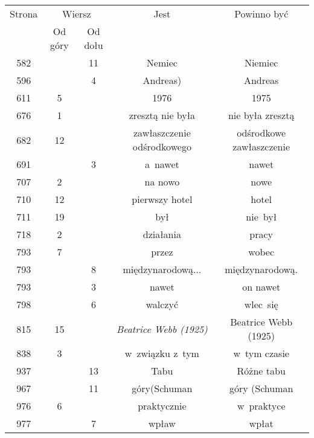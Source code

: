 \documentclass[a4paper,11pt]{article}
\numberwithin{equation}{section}
\begin{document}
\begin{center}
  \newpage

  \begin{tabular}{|c|c|c|c|c|}
    \hline
    Strona & \multicolumn{2}{c|}{Wiersz} & Jest
                              & Powinno być \\ \cline{2-3}
    & Od góry & Od dołu & & \\
    \hline
    582 & & 11 & Nemiec & Niemiec \\
    596 & &  4 & Andreas) & Andreas \\
    611 &  5 & & 1976 & 1975 \\
    676 &  1 & & zresztą nie była & nie była zresztą \\
    682 & 12 & & zawłaszczenie odśrodkowego & odśrodkowe zawłaszczenie \\
    691 & &  3 & a~nawet & nawet \\
    707 &  2 & & na nowo & nowe \\
    710 & 12 & & pierwszy hotel & hotel \\
    711 & 19 & & był & nie~był \\
    718 &  2 & & działania & pracy \\
    793 &  7 & & przez & wobec \\
    793 & &  8 & międzynarodową... & międzynarodową. \\
    793 & &  3 & nawet & on nawet \\
    798 & &  6 & walczyć & wlec~się \\
    815 & 15 & & \textit{Beatrice Webb (1925)} & Beatrice Webb (1925) \\
    838 &  3 & & w~związku z~tym & w~tym czasie \\
    937 & & 13 & Tabu & Różne tabu \\
    967 & & 11 & góry(Schuman & góry (Schuman \\
    976 &  6 & & praktycznie & w~praktyce \\
    977 & &  7 & wpław & wpłat \\
    \hline
  \end{tabular}

\end{center}

\VerSpaceTwo
\end{document}

